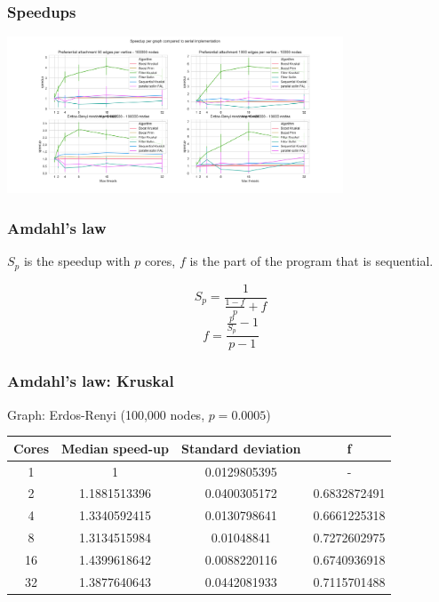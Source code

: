 \documentclass{beamer}
\begin{document}
\begin{frame}
\frametitle{Speedups}
\centering
\includegraphics[width=10cm]{Speedup.png}
\end{frame}

\begin{frame}
    \frametitle{Amdahl's law}

	$S_p$ is the speedup with $p$ cores, $f$ is the part of the program that is sequential.

	\[
		S_p = \frac{1}{\frac{1-f}{p} + f}
	\]
	\[
		f = \frac{\frac{p}{S_p} - 1}{p - 1}
	\]

\end{frame}

\begin{frame}

    \frametitle{Amdahl's law: Kruskal}

	Graph: Erdos-Renyi (100,000 nodes, $p=0.0005$)

	\begin{center}
		\begin{tabular}{||c c c c||} 
			\hline
            Cores & Median speed-up & Standard deviation & f \\ [0.5ex] 
			\hline\hline
            1 & 1 & 0.0129805395 & - \\
			\hline
            2 & 1.1881513396 & 0.0400305172 & 0.6832872491 \\
			\hline
            4 & 1.3340592415 & 0.0130798641 & 0.6661225318 \\
			\hline
            8 & 1.3134515984 & 0.01048841 & 0.7272602975 \\
			\hline
            16 & 1.4399618642 & 0.0088220116 & 0.6740936918 \\
			\hline
            32 & 1.3877640643 & 0.0442081933 & 0.7115701488 \\ [1ex] 
			\hline
		\end{tabular}
	\end{center}

\end{frame}
\end{document}

